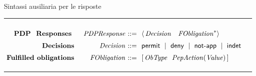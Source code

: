 \begin{table}[]
\footnotesize

\caption{Sintassi ausiliaria per le risposte}
\hrule
$
\begin{array}{@{\ }r@{\ \ \ \ }r@{\ }r@{\ \ }l@{\ }}

&&&\\[-.2cm]
{\textbf{PDP \ Responses }} &
\mathit{PDPResponse} & ::= & \langle \,\mathit{Decision} \ \ \ \mathit{FObligation}^* \rangle
\\[.2cm]
{\textbf{Decisions}} &
\mathit{Decision} & ::= & \permit \Sep \deny \Sep \notApp \Sep \indet
\\[.2cm]
{\textbf{Fulfilled obligations}} &
\mathit{FObligation} & ::= &  [ \, \mathit{ObType} \ \ \mathit{PepAction}(\mathit{Value}) \, ]\\[.1cm]

\end{array}
$\\
\hrule
\label{tab:facpl_context_syntax}
\end{table}
